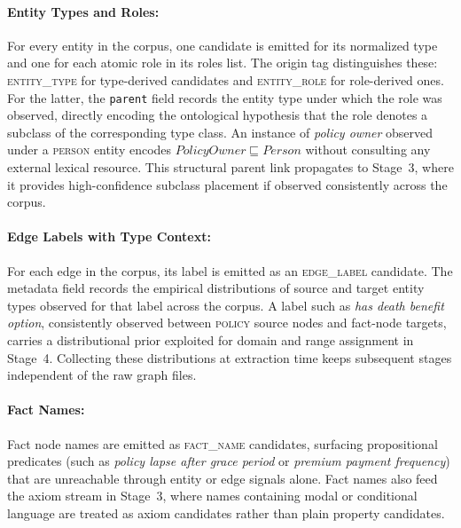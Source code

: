 \documentclass[sigconf]{acmart}
\begin{document}
\vspace{-0.5em}
\paragraph{\textbf{Entity Types and Roles:}}
For every entity in the corpus, one candidate is emitted for its normalized 
type and one for each atomic role in its roles list. The origin tag 
distinguishes these: \textsc{entity\_type} for type-derived candidates and 
\textsc{entity\_role} for role-derived ones. For the latter, the \texttt{parent} 
field records the entity type under which the role was observed, directly 
encoding the ontological hypothesis that the role denotes a subclass of the 
corresponding type class. An instance of \textit{policy owner} observed under a 
\textsc{person} entity encodes $\mathit{PolicyOwner} \sqsubseteq \mathit{Person}$ 
without consulting any external lexical resource. This structural parent link 
propagates to Stage~3, where it provides high-confidence subclass placement if 
observed consistently across the corpus.

\vspace{-0.5em}
\paragraph{\textbf{Edge Labels with Type Context:}}
For each edge in the corpus, its label is emitted as an \textsc{edge\_label} 
candidate. The metadata field records the empirical distributions of source and 
target entity types observed for that label across the corpus. A label such as 
\textit{has death benefit option}, consistently observed between \textsc{policy} 
source nodes and fact-node targets, carries a distributional prior exploited for 
domain and range assignment in Stage~4. Collecting these distributions at 
extraction time keeps subsequent stages independent of the raw graph files.

\vspace{-0.5em}
\paragraph{\textbf{Fact Names:}}
Fact node names are emitted as \textsc{fact\_name} candidates, surfacing 
propositional predicates (such as \textit{policy lapse after grace period} or 
\textit{premium payment frequency}) that are unreachable through entity or edge 
signals alone. Fact names also feed the axiom stream in Stage~3, where names 
containing modal or conditional language are treated as axiom candidates rather 
than plain property candidates.
\end{document}
